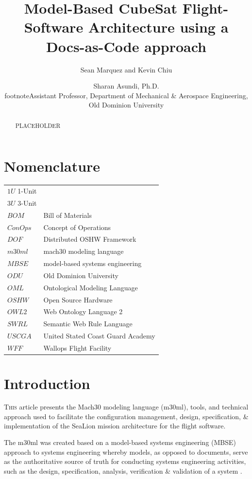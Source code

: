 \documentclass[conf]{new-aiaa}
\title{Model-Based CubeSat Flight-Software Architecture using a Docs-as-Code approach}
\author{Sean Marquez and Kevin Chiu}
\affil{Old Dominion University, Norfolk, VA, 23529}
\author{Sharan Asundi, Ph.D. \\footnote{Assistant Professor, Department of Mechanical & Aerospace Engineering, Old Dominion University}}
\affil{Old Dominion University, Norfolk, VA, 23529}
\begin{document}
\maketitle

\begin{abstract}
PLACEHOLDER
\end{abstract}

\section{Nomenclature}

{\renewcommand\arraystretch{1.0}
\noindent\begin{longtable*}{@{}l @{\quad=\quad} l@{}}
$1U$ 1-Unit \\
$3U$ 3-Unit \\
$BOM$  & Bill of Materials \\
$ConOps$  & Concept of Operations \\
$DOF$  & Distributed OSHW Framework  \\
$m30ml$  & mach30 modeling language \\
$MBSE$ &    model-based systems engineering  \\
$ODU$& Old Dominion University \\
$OML$  & Ontological Modeling Language \\
$OSHW$ & Open Source Hardware \\
$OWL2$ & Web Ontology Language 2 \\
$SWRL$ & Semantic Web Rule Language \\
$USCGA$ & United Stated Coast Guard Academy \\
$WFF$   & Wallops Flight Facility  
\end{longtable*}}

\section{Introduction}
\lettrine{T}{his} article presents the Mach30 modeling language (m30ml), tools, and technical approach used to facilitate the configuration management, design, specification, & implementation of the SeaLion mission architecture for the flight software.

The m30ml was created based on a model-based systems engineering (MBSE) approach to systems engineering whereby models, as opposed to documents, serve as the authoritative source of truth for conducting systems engineering activities, such as the design, specification, analysis, verification & validation of a system \cite{architecting_spacecraft}.
\end{document}
